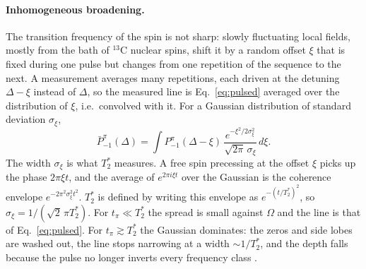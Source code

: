 \paragraph{Inhomogeneous broadening.} The transition frequency of the spin is not sharp: slowly fluctuating local
fields, mostly from the bath of $^{13}$C nuclear spins, shift it by a random offset $\xi$ that is fixed during one
pulse but changes from one repetition of the sequence to the next. A measurement averages many repetitions, each
driven at the detuning $\Delta-\xi$ instead of $\Delta$, so the measured line is Eq.~\eqref{eq:pulsed} averaged over
the distribution of $\xi$, i.e.\ convolved with it. For a Gaussian distribution of standard deviation $\sigma_\xi$,
\begin{equation}
  \bar P_{-1}^{\pi}(\Delta)=\int P_{-1}^{\pi}(\Delta-\xi)\,\frac{e^{-\xi^2/2\sigma_\xi^2}}{\sqrt{2\pi}\,\sigma_\xi}\,d\xi .
  \label{eq:pulsed-t2star}
\end{equation}
The width $\sigma_\xi$ is what $T_2^*$ measures. A free spin precessing at the offset $\xi$ picks up the phase
$2\pi\xi t$, and the average of $e^{2\pi i\xi t}$ over the Gaussian is the coherence envelope
$e^{-2\pi^2\sigma_\xi^2t^2}$. $T_2^*$ is defined by writing this envelope as $e^{-(t/T_2^*)^2}$, so
$\sigma_\xi=1/(\sqrt2\,\pi T_2^*)$. For $t_\pi\ll T_2^*$ the spread is small against $\Omega$ and the line is that of
Eq.~\eqref{eq:pulsed}. For $t_\pi\gtrsim T_2^*$ the Gaussian dominates: the zeros and side lobes are washed out, the
line stops narrowing at a width $\sim1/T_2^*$, and the depth falls because the pulse no longer inverts every
frequency class \cite{dreau2011}.

